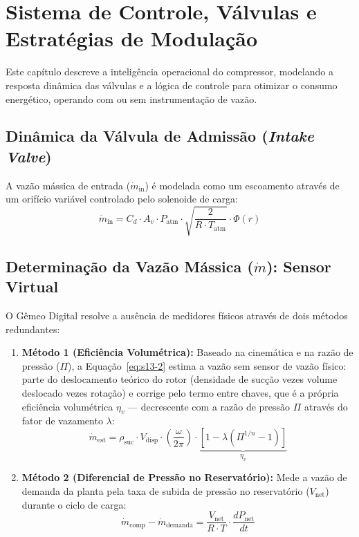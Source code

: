 \documentclass[12pt,a4paper]{article}
\numberwithin{equation}{section}
\numberwithin{table}{section}
\numberwithin{figure}{section}
\begin{document}
	
	\section{\textbf{Sistema de Controle, Válvulas e Estratégias de Modulação}}
	
	Este capítulo descreve a inteligência operacional do compressor, modelando a resposta dinâmica das válvulas e a lógica de controle para otimizar o consumo energético, operando com ou sem instrumentação de vazão.
	
	\subsection{\textbf{Dinâmica da Válvula de Admissão (\textit{Intake Valve})}}
	A vazão mássica de entrada ($\dot{m}_{\text{in}}$) é modelada como um escoamento através de um orifício variável controlado pelo solenoide de carga:
	\begin{equation}\label{eq:s13-1}
 \dot{m}_{\text{in}} = C_d \cdotp A_v \cdotp P_{\text{atm}} \cdotp \sqrt{\frac{2}{R \cdotp T_{\text{atm}}}} \cdotp \Phi(r) 
\end{equation}
	
	\subsection{\textbf{Determinação da Vazão Mássica ($\dot{m}$): Sensor Virtual}}
	O Gêmeo Digital resolve a ausência de medidores físicos através de dois métodos redundantes:
	\begin{enumerate}
		\item \textbf{Método 1 (Eficiência Volumétrica):} Baseado na cinemática e na razão de pressão ($\Pi$), a Equação~\eqref{eq:s13-2} estima a vazão sem sensor de vazão físico: parte do deslocamento teórico do rotor (densidade de sucção vezes volume deslocado vezes rotação) e corrige pelo termo entre chaves, que é a própria eficiência volumétrica $\eta_v$ — decrescente com a razão de pressão $\Pi$ através do fator de vazamento $\lambda$:
		\begin{equation}\label{eq:s13-2}
 \dot{m}_{\text{est}} = \rho_{\text{suc}} \cdotp V_{\text{disp}} \cdotp \left( \frac{\omega}{2\pi} \right) \cdotp \underbrace{[1 - \lambda (\Pi^{1/n} - 1)]}_{\eta_v}
\end{equation}
		\item \textbf{Método 2 (Diferencial de Pressão no Reservatório):} Mede a vazão de demanda da planta pela taxa de subida de pressão no reservatório ($V_{\text{net}}$) durante o ciclo de carga:
		\begin{equation}\label{eq:s13-3}
 \dot{m}_{\text{comp}} - \dot{m}_{\text{demanda}} = \frac{V_{\text{net}}}{R \cdotp T} \cdotp \frac{dP_{\text{net}}}{dt} 
\end{equation}
	\end{enumerate}
	
\end{document}
